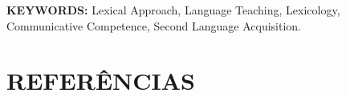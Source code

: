 \documentclass[
    a4paper,          %
    12pt,             %
    section=TITLE,    %
    subsection=Title, %
    oneside,          %
    english,          %
    spanish,          %
    brazil,           %
    fleqn             %
]{abntex2}
\begin{document}
  \noindent \textbf{KEYWORDS:} Lexical Approach, Language Teaching, Lexicology, Communicative Competence, Second Language Acquisition.

  

  \section{REFERÊNCIAS}

  

  
\end{document}
